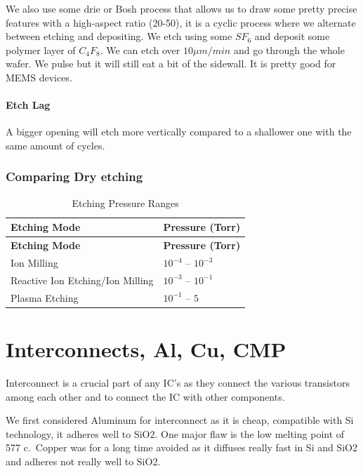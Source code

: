 \documentclass[
]{article}
\begin{document}
We also use some {drie} or Bosh process that allows us to draw some
pretty precise features with a high-aspect ratio (20-50), it is a cyclic
process where we alternate between etching and depositing. We etch using
some \(SF_6\) and deposit some polymer layer of \(C_4F_8\). We can etch
over \(10 \mu m/min\) and go through the whole wafer. We pulse but it
will still eat a bit of the sidewall. It is pretty good for MEMS
devices.

\hypertarget{etch-lag}{%
\paragraph{Etch Lag}\label{etch-lag}}

A bigger opening will etch more vertically compared to a shallower one
with the same amount of cycles.

\hypertarget{comparing-dry-etching}{%
\subsubsection{Comparing Dry etching}\label{comparing-dry-etching}}

\begin{longtable}[]{@{}ll@{}}
\caption{Etching Pressure Ranges}\tabularnewline
\toprule\noalign{}
\textbf{Etching Mode} & \textbf{Pressure (Torr)} \\
\midrule\noalign{}
\endfirsthead
\toprule\noalign{}
\textbf{Etching Mode} & \textbf{Pressure (Torr)} \\
\midrule\noalign{}
\endhead
\bottomrule\noalign{}
\endlastfoot
Ion Milling & \(10^{-4}\) -- \(10^{-3}\) \\
Reactive Ion Etching/Ion Milling & \(10^{-3}\) -- \(10^{-1}\) \\
Plasma Etching & \(10^{-1}\) -- \(5\) \\
\end{longtable}

\hypertarget{interconnects-al-cu-cmp}{%
\section{Interconnects, Al, Cu, CMP}\label{interconnects-al-cu-cmp}}

Interconnect is a crucial part of any IC's as they connect the various
transistors among each other and to connect the IC with other
components.

We first considered Aluminum for interconnect as it is cheap, compatible
with Si technology, it adheres well to SiO2. One major flaw is the low
melting point of 577 c.~Copper was for a long time avoided as it
diffuses really fast in Si and SiO2 and adheres not really well to SiO2.
\end{document}

